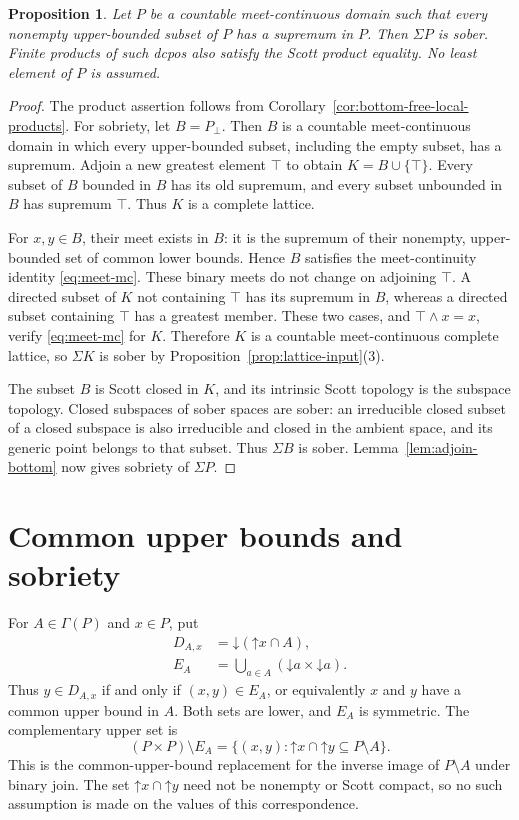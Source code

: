 \documentclass[10pt,a4paper]{amsart}
\newtheorem{proposition}[theorem]{Proposition}
\numberwithin{equation}{section}
\newcommand{\down}[1]{\mathord{\downarrow}#1}
\newcommand{\up}[1]{\mathord{\uparrow}#1}
\newcommand{\Sig}{\Sigma}
\newcommand{\mc}{\wedge}
\begin{document}
\begin{proposition}\label{prop:bounded-complete-sober}
Let $P$ be a countable meet-continuous domain such that every nonempty upper-bounded subset of $P$ has a supremum in $P$. Then $\Sig P$ is sober. Finite products of such dcpos also satisfy the Scott product equality. No least element of $P$ is assumed.
\end{proposition}
\begin{proof}
The product assertion follows from Corollary~\ref{cor:bottom-free-local-products}. For sobriety, let $B=P_\bot$. Then $B$ is a countable meet-continuous domain in which every upper-bounded subset, including the empty subset, has a supremum. Adjoin a new greatest element $\top$ to obtain $K=B\cup\{\top\}$. Every subset of $B$ bounded in $B$ has its old supremum, and every subset unbounded in $B$ has supremum $\top$. Thus $K$ is a complete lattice.

For $x,y\in B$, their meet exists in $B$: it is the supremum of their nonempty, upper-bounded set of common lower bounds. Hence $B$ satisfies the meet-continuity identity \eqref{eq:meet-mc}. These binary meets do not change on adjoining $\top$. A directed subset of $K$ not containing $\top$ has its supremum in $B$, whereas a directed subset containing $\top$ has a greatest member. These two cases, and $\top\mc x=x$, verify \eqref{eq:meet-mc} for $K$. Therefore $K$ is a countable meet-continuous complete lattice, so $\Sig K$ is sober by Proposition~\ref{prop:lattice-input}\textup{(3)}.

The subset $B$ is Scott closed in $K$, and its intrinsic Scott topology is the subspace topology. Closed subspaces of sober spaces are sober: an irreducible closed subset of a closed subspace is also irreducible and closed in the ambient space, and its generic point belongs to that subset. Thus $\Sig B$ is sober. Lemma~\ref{lem:adjoin-bottom} now gives sobriety of $\Sig P$.
\end{proof}

\section{Common upper bounds and sobriety}\label{sec:upper-bounds}
For $A\in\Gamma(P)$ and $x\in P$, put
\begin{equation}\label{eq:upper-bound-sets}
 \begin{aligned}
 D_{A,x}&=\down(\up x\cap A),\\
 E_A&=\bigcup_{a\in A}(\down a\times\down a).
 \end{aligned}
\end{equation}
Thus $y\in D_{A,x}$ if and only if $(x,y)\in E_A$, or equivalently $x$ and $y$ have a common upper bound in $A$. Both sets are lower, and $E_A$ is symmetric. The complementary upper set is
\[
 (P\times P)\setminus E_A
 =\{(x,y):\up x\cap\up y\subseteq P\setminus A\}.
\]
This is the common-upper-bound replacement for the inverse image of $P\setminus A$ under binary join. The set $\up x\cap\up y$ need not be nonempty or Scott compact, so no such assumption is made on the values of this correspondence.
\end{document}
